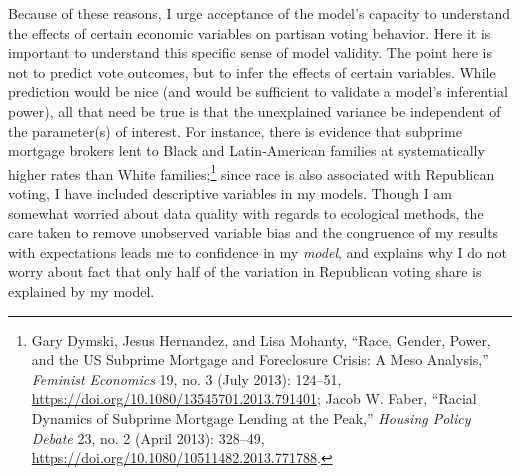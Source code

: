 \documentclass[12pt,oneside]{psthesis}
\begin{document}
Because of these reasons, I urge acceptance of the model's capacity to understand the effects of certain economic variables on partisan voting behavior.
Here it is important to understand this specific sense of model validity.
The point here is not to predict vote outcomes, but to infer the effects of certain variables.
While prediction would be nice (and would be sufficient to validate a model's inferential power), all that need be true is that the unexplained variance be independent of the parameter(s) of interest.
For instance, there is evidence that subprime mortgage brokers lent to Black and Latin-American families at systematically higher rates than White families;\footnote{Gary Dymski, Jesus Hernandez, and Lisa Mohanty, ``Race, Gender, Power, and the US Subprime Mortgage and Foreclosure Crisis: A Meso Analysis,'' \emph{Feminist Economics} 19, no. 3 (July 2013): 124--51, \url{https://doi.org/10.1080/13545701.2013.791401}; Jacob W. Faber, ``Racial Dynamics of Subprime Mortgage Lending at the Peak,'' \emph{Housing Policy Debate} 23, no. 2 (April 2013): 328--49, \url{https://doi.org/10.1080/10511482.2013.771788}.} since race is also associated with Republican voting, I have included descriptive variables in my models.
Though I am somewhat worried about data quality with regards to ecological methods, the care taken to remove unobserved variable bias and the congruence of my results with expectations leads me to confidence in my \emph{model}, and explains why I do not worry about fact that only half of the variation in Republican voting share is explained by my model.
\end{document}
